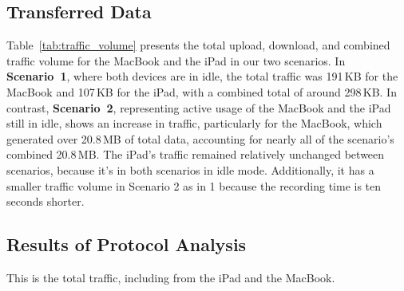 \documentclass[sigconf,nonacm]{acmart}
\begin{document}
\subsection{Transferred Data}
\label{sec:transfered_data_analysis}
\begin{table}[ht]
\centering
{}
\caption{Total Traffic Volume by Device and Scenario}
\label{tab:traffic_volume}
\end{table}
Table~\ref{tab:traffic_volume} presents the total upload, download, and combined traffic volume for the MacBook and the iPad in our two scenarios. In \textbf{Scenario~1}, where both devices are in idle, the total traffic was  191\,KB for the MacBook and 107\,KB for the iPad, with a combined total of around 298\,KB. In contrast, \textbf{Scenario~2}, representing active usage of the MacBook and the iPad still in idle, shows an increase in traffic, particularly for the MacBook, which generated over 20.8\,MB of total data, accounting for nearly all of the scenario’s combined 20.8\,MB. The iPad’s traffic remained relatively unchanged between scenarios, because it's in both scenarios in idle mode. Additionally, it has a smaller traffic volume in Scenario 2 as in 1 because the recording time is ten seconds shorter. 


\subsection{Results of Protocol Analysis}
\label{sec:part2_results_protocol_analyse}
This is the total traffic, including from the iPad and the MacBook.
\end{document}
